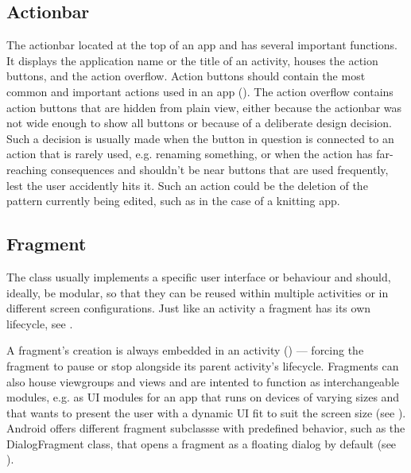 \subsection{Actionbar}
The actionbar located at the top of an app and has several important functions. It displays the application name or the title of an activity, houses the action buttons, and the action overflow. Action buttons should contain the most common and important actions used in an app (\cite{actionbar}). The action overflow contains action buttons that are hidden from plain view, either because the actionbar was not wide enough to show all buttons or because of a deliberate design decision. Such a decision is usually made when the button in question is connected to an action that is rarely used, e.g. renaming something, or when the action has far-reaching consequences and shouldn't be near buttons that are used frequently, lest the user accidently hits it. Such an action could be the deletion of the pattern currently being edited, such as in the case of a knitting app. 

\subsection{Fragment}
\label{impl:fragment}
The  class usually implements a specific user interface or behaviour and should, ideally, be modular, so that they can be reused within multiple activities or in different screen configurations. Just like an activity a fragment has its own lifecycle, see .

A fragment's creation is always embedded in an activity (\cite{androidfragment}) --- forcing the fragment to pause or stop alongside its parent activity's lifecycle. Fragments can also house viewgroups and views and are intented to function as interchangeable modules, e.g. as \gls{UI} modules for an app that runs on devices of varying sizes and that wants to present the user with a dynamic \gls{UI} fit to suit the screen size (see ). Android offers different fragment subclassse with predefined behavior, such as the DialogFragment class, that opens a fragment as a floating dialog by default (see ).

